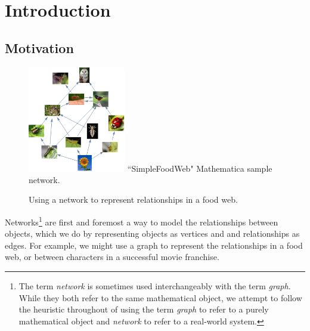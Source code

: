 \documentclass[12pt]{thesis}
\theoremstyle{plain}
\theoremstyle{definition}
\theoremstyle{remark}
\begin{document}

\tableofcontents
\listoftables
\listoffigures
\mainmatter
















\chapter{Introduction}\label{chapter:introduction_and_background}

\section{Motivation}

\begin{figure}
\centering
\vspace{-20pt}
\includegraphics[width=0.38\textwidth]{foodweb.png}
\scriptsize
``SimpleFoodWeb" Mathematica sample network.
\caption{Using a network to represent relationships in a food web.}
\vspace{-20pt}
\label{fig:foodweb}
\end{figure}

Networks\footnote{The term \textit{network} is sometimes used interchangeably with the term \textit{graph}. While they both refer to the same mathematical object, we attempt to follow the heuristic throughout of using the term \textit{graph} to refer to a purely mathematical object and \textit{network} to refer to a real-world system.} are first and foremost a way to model the relationships between objects, which we do by representing objects as vertices and and relationships as edges. For example, we might use a graph to represent the relationships in a food web, or between characters in a successful movie franchise.
\end{document}
